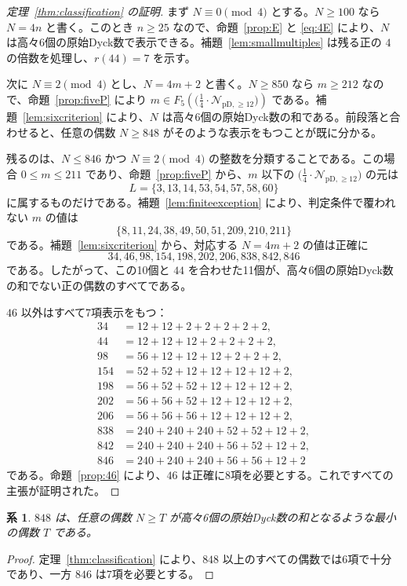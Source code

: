 \documentclass[12pt]{ltjsarticle}
\theoremstyle{plain}
\newtheorem{corollary}[theorem]{系}
\theoremstyle{definition}
\theoremstyle{plain}
\newcommand{\Pset}{%
  \bigl(\tfrac{1}{4}\cdot\mathcal{N}_{\mathrm{pD},\geq 12}\bigr)%
}
\begin{document}
\begin{proof}[定理~\ref{thm:classification} の証明]
まず $N\equiv0\pmod4$ とする。$N\geq100$ なら $N=4n$ と書く。このとき $n\geq25$ なので、命題~\ref{prop:E} と \eqref{eq:4E} により、$N$ は高々6個の原始Dyck数で表示できる。補題~\ref{lem:smallmultiples} は残る正の $4$ の倍数を処理し、$r(44)=7$ を示す。

次に $N\equiv2\pmod4$ とし、$N=4m+2$ と書く。$N\geq850$ なら $m\geq212$ なので、命題~\ref{prop:fiveP} により $m\in F_5(\Pset)$ である。補題~\ref{lem:sixcriterion} により、$N$ は高々6個の原始Dyck数の和である。前段落と合わせると、任意の偶数 $N\geq848$ がそのような表示をもつことが既に分かる。

残るのは、$N\leq846$ かつ $N\equiv2\pmod4$ の整数を分類することである。この場合 $0\leq m\leq211$ であり、命題~\ref{prop:fiveP} から、$m$ 以下の $\Pset$ の元は
\[
 L=\{3,13,14,53,54,57,58,60\}
\]
に属するものだけである。補題~\ref{lem:finiteexception} により、判定条件で覆われない $m$ の値は
\[
 \{8,11,24,38,49,50,51,209,210,211\}
\]
である。補題~\ref{lem:sixcriterion} から、対応する $N=4m+2$ の値は正確に
\[
 34,46,98,154,198,202,206,838,842,846
\]
である。したがって、この10個と $44$ を合わせた11個が、高々6個の原始Dyck数の和でない正の偶数のすべてである。

$46$ 以外はすべて7項表示をもつ：
\[
\begin{aligned}
34&=12+12+2+2+2+2+2,\\
44&=12+12+12+2+2+2+2,\\
98&=56+12+12+12+2+2+2,\\
154&=52+52+12+12+12+12+2,\\
198&=56+52+52+12+12+12+2,\\
202&=56+56+52+12+12+12+2,\\
206&=56+56+56+12+12+12+2,\\
838&=240+240+240+52+52+12+2,\\
842&=240+240+240+56+52+12+2,\\
846&=240+240+240+56+56+12+2
\end{aligned}
\]
である。命題~\ref{prop:46} により、$46$ は正確に8項を必要とする。これですべての主張が証明された。
\end{proof}

\begin{corollary}\label{cor:threshold}
$848$ は、任意の偶数 $N\geq T$ が高々6個の原始Dyck数の和となるような最小の偶数 $T$ である。
\end{corollary}

\begin{proof}
定理~\ref{thm:classification} により、$848$ 以上のすべての偶数では6項で十分であり、一方 $846$ は7項を必要とする。
\end{proof}
\end{document}
